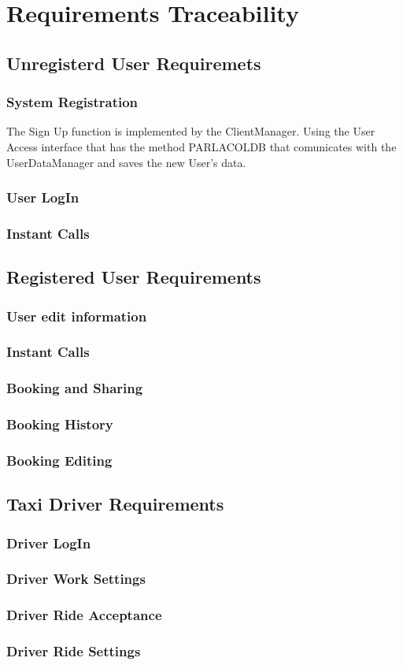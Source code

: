 \section{Requirements Traceability}
	\subsection {Unregisterd User Requiremets}

		\subsubsection{System Registration}
		The Sign Up function is implemented by the ClientManager. Using the User Access interface that has the method PARLACOLDB that comunicates with the UserDataManager and saves the new User's data.
		\subsubsection{User LogIn}
		\subsubsection{Instant Calls}
		
		
	\subsection {Registered User Requirements}
	
		\subsubsection{User edit information}
		\subsubsection{Instant Calls}
		\subsubsection{Booking and Sharing}
		\subsubsection{Booking History}
		\subsubsection{Booking Editing}
		
		
	\subsection {Taxi Driver Requirements}
	
		\subsubsection{Driver LogIn}
		\subsubsection{Driver Work Settings}
		\subsubsection{Driver Ride Acceptance}
		\subsubsection{Driver Ride Settings}
